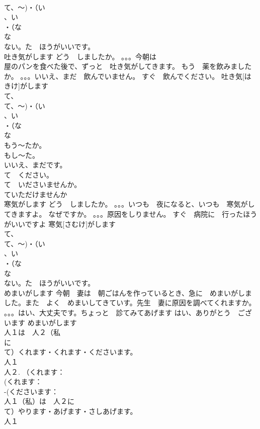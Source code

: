 \documentclass[8pt]{extreport}
\begin{document}
\begin{CJK}{UTF8}{min}
\\	て、～)・（い
\\	、い
\\	・（な
\\	な
\\	ない。た　ほうがいいです。
\\	吐き気がします	どう　しましたか。 。。。今朝は 
\\	屋のパンを食べた後で、ずっと　吐き気がしてきます。 もう　薬を飲みましたか。 。。。いいえ、まだ　飲んでいません。 すぐ　飲んでください。	吐き気[はきけ]がします			
\\	て、
\\	て、～)・（い
\\	、い
\\	・（な
\\	な
\\	もう～たか。
\\	もし～た。
\\	いいえ、まだです。 
\\	て　ください。　
\\	て　いださいませんか。
\\	ていただけませんか 
\\	寒気がします	どう　しましたか。 。。。いつも　夜になると、いつも　寒気がしてきますよ。 なぜですか。 。。。原因をしりません。 すぐ　病院に　行ったほうがいいですよ	寒気[さむけ]がします			
\\	て、
\\	て、～)・（い
\\	、い
\\	・（な
\\	な
\\	ない。た　ほうがいいです。
\\	めまいがします	今朝　妻は　朝ごはんを作っているとき、急に　めまいがしました。また　よく　めまいしてきていす。先生　妻に原因を調べてくれますか。 。。。はい、大丈夫です。ちょっと　診てみてあげます はい、ありがとう　ございます	めまいがします			
\\	人１は　人２（私
\\	に　
\\	て）くれます・くれます・くださいます。
\\	人１
\\	人２. （くれます：
\\	(くれます：
\\	-(くださいます：
\\	人１（私）は　人２に　
\\	て）やります・あげます・さしあげます。
\\	人１

\end{CJK}
\end{document}
